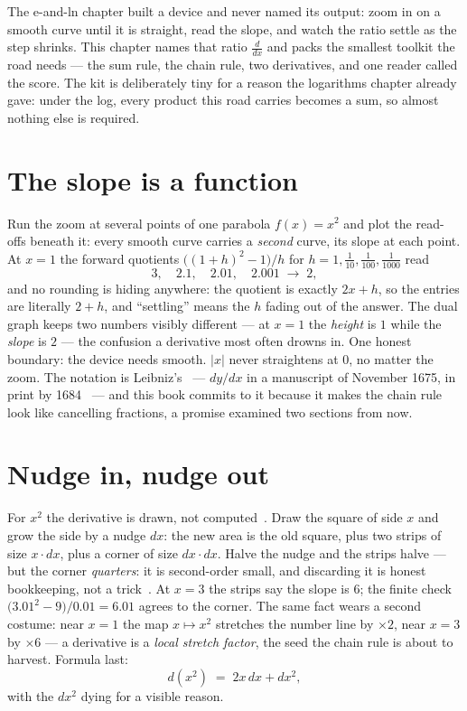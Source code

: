 \begin{narrative}
The e-and-ln chapter built a device and never named its output: zoom
in on a smooth curve until it is straight, read the slope, and watch
the ratio settle as the step shrinks. This chapter names that ratio
$\frac{d}{dx}$ and packs the smallest toolkit the road needs — the sum
rule, the chain rule, two derivatives, and one reader called the
score. The kit is deliberately tiny for a reason the logarithms
chapter already gave: under the log, every product this road carries
becomes a sum, so almost nothing else is required.

\section{The slope is a function}

Run the zoom at several points of one parabola $f(x) = x^2$ and plot
the read-offs beneath it: every smooth curve carries a \emph{second}
curve, its slope at each point. At $x = 1$ the forward quotients
$\bigl((1+h)^2 - 1\bigr)/h$ for $h = 1, \tfrac{1}{10}, \tfrac{1}{100},
\tfrac{1}{1000}$ read
\[
  3, \quad 2.1, \quad 2.01, \quad 2.001 \;\longrightarrow\; 2,
\]
and no rounding is hiding anywhere: the quotient is exactly $2x + h$,
so the entries are literally $2 + h$, and ``settling'' means the $h$
fading out of the answer. The dual graph keeps two numbers visibly
different — at $x = 1$ the \emph{height} is $1$ while the
\emph{slope} is $2$ — the confusion a derivative most often drowns
in. One honest boundary: the device needs smooth. $|x|$ never
straightens at $0$, no matter the zoom. The notation is
Leibniz's~\cite{calculus-jeff-miller-earliest-uses-of-symbols-of-calculus} —
$dy/dx$ in a manuscript of November 1675, in print by
1684~\cite{calculus-wikipedia-nova-methodus-pro-maximis-et-minimis} —
and this book commits to it because it makes the chain rule look like
cancelling fractions, a promise examined two sections from now.

\section{Nudge in, nudge out}

For $x^2$ the derivative is drawn, not
computed~\cite{calculus-grant-sanderson-power-rule-through-geometry}.
Draw the square of side $x$ and grow the side by a nudge $dx$: the new
area is the old square, plus two strips of size $x \cdot dx$, plus a
corner of size $dx \cdot dx$. Halve the nudge and the strips halve —
but the corner \emph{quarters}: it is second-order small, and
discarding it is honest bookkeeping, not a
trick~\cite{calculus-silvanus-p-thompson-calculus-made-easy-1910}. At
$x = 3$ the strips say the slope is $6$; the finite check
$\bigl(3.01^2 - 9\bigr)/0.01 = 6.01$ agrees to the corner. The same
fact wears a second costume: near $x = 1$ the map $x \mapsto x^2$
stretches the number line by $\times 2$, near $x = 3$ by $\times 6$ —
a derivative is a \emph{local stretch factor}, the seed the chain
rule is about to harvest. Formula last:
\[
  d(x^2) \;=\; 2x\,dx + dx^2 ,
\]
with the $dx^2$ dying for a visible reason.


\end{narrative}
